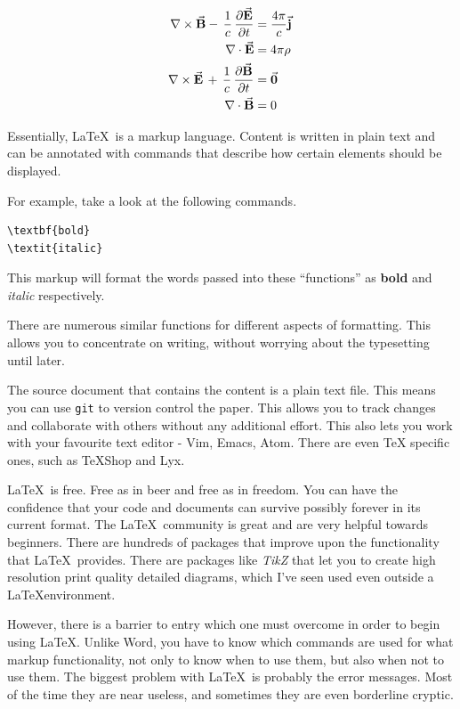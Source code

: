\documentclass[journal,10pt,final]{IEEEtran}
\begin{document}
\begin{align}
  \hskip6em \nabla \times \vec{\mathbf{B}} -\, \frac1c\, \frac{\partial\vec{\mathbf{E}}}{\partial t} & = \frac{4\pi}{c}\vec{\mathbf{j}} \hskip6em \\
  \nabla \cdot \vec{\mathbf{E}} & = 4 \pi \rho \\
  \nabla \times \vec{\mathbf{E}}\, +\, \frac1c\, \frac{\partial\vec{\mathbf{B}}}{\partial t} & = \vec{\mathbf{0}} \\
  \nabla \cdot \vec{\mathbf{B}} & = 0
\end{align}

Essentially, \LaTeX~is a markup language. Content is written in plain
text and can be annotated with commands that describe how certain
elements should be displayed.

For example, take a look at the following commands.

\begin{verbatim}
\textbf{bold}
\textit{italic}
\end{verbatim}

This markup will format the words passed into these ``functions'' as
\textbf{bold} and \emph{italic} respectively.

There are numerous similar functions for different aspects of
formatting. This allows you to concentrate on writing, without worrying
about the typesetting until later.

The source document that contains the content is a plain text file. This
means you can use \texttt{git} to version control the paper. This allows
you to track changes and collaborate with others without any additional
effort. This also lets you work with your favourite text editor - Vim,
Emacs, Atom. There are even TeX specific ones, such as TeXShop and Lyx.

\LaTeX~is free. Free as in beer and free as in freedom. You can have the
confidence that your code and documents can survive possibly forever in
its current format. The \LaTeX~community is great and are very helpful
towards beginners. There are hundreds of packages that improve upon the
functionality that \LaTeX~provides. There are packages like \emph{TikZ}
that let you to create high resolution print quality detailed diagrams,
which I've seen used even outside a \LaTeX environment.

However, there is a barrier to entry which one must overcome in order to
begin using \LaTeX. Unlike Word, you have to know which commands are
used for what markup functionality, not only to know when to use them,
but also when not to use them. The biggest problem with \LaTeX~is
probably the error messages. Most of the time they are near useless, and
sometimes they are even borderline cryptic.
\end{document}

